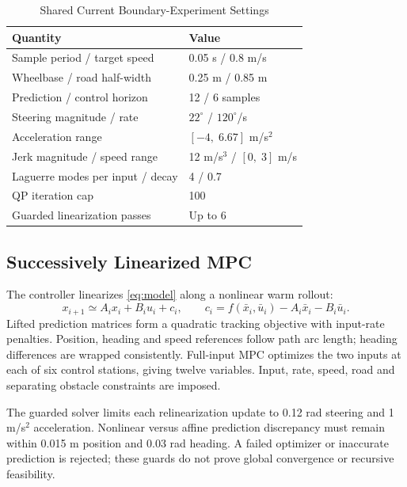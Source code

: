 \documentclass[conference]{IEEEtran}
\begin{document}
\begin{table}[t]
\caption{Shared Current Boundary-Experiment Settings}
\label{tab:settings}
\centering
\begin{tabular}{ll}
\toprule
Quantity & Value\\
\midrule
Sample period / target speed & 0.05 s / 0.8 m/s\\
Wheelbase / road half-width & 0.25 m / 0.85 m\\
Prediction / control horizon & 12 / 6 samples\\
Steering magnitude / rate & $22^\circ$ / $120^\circ$/s\\
Acceleration range & $[-4,\;6.67]$ m/s$^2$\\
Jerk magnitude / speed range & 12 m/s$^3$ / $[0,\;3]$ m/s\\
Laguerre modes per input / decay & 4 / 0.7\\
QP iteration cap & 100\\
Guarded linearization passes & Up to 6\\
\bottomrule
\end{tabular}
\end{table}

\subsection{Successively Linearized MPC}
The controller linearizes \eqref{eq:model} along a nonlinear warm rollout:
\begin{equation}
x_{i+1}\simeq A_i x_i+B_i u_i+c_i,\qquad
c_i=f(\bar{x}_i,\bar{u}_i)-A_i\bar{x}_i-B_i\bar{u}_i.
\end{equation}
Lifted prediction matrices form a quadratic tracking objective with input-rate
penalties. Position, heading and speed references follow path arc length;
heading differences are wrapped consistently. Full-input MPC optimizes the
two inputs at each of six control stations, giving twelve variables.
Input, rate, speed, road and separating obstacle constraints are imposed.

The guarded solver limits each relinearization update to 0.12 rad steering
and 1 m/s$^2$ acceleration. Nonlinear versus affine prediction discrepancy
must remain within 0.015 m position and 0.03 rad heading. A failed optimizer
or inaccurate prediction is rejected; these guards do not prove global
convergence or recursive feasibility.
\end{document}
